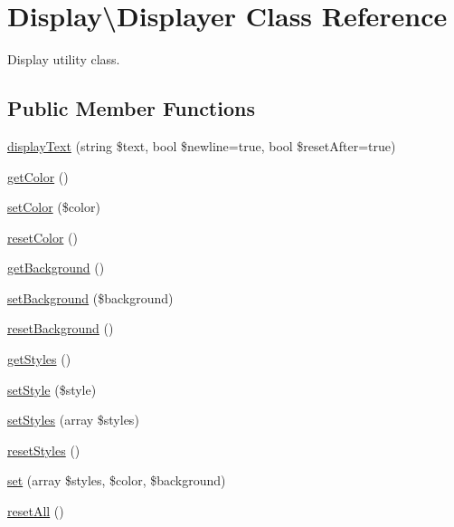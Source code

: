 \hypertarget{classDisplay_1_1Displayer}{}\section{Display\textbackslash{}Displayer Class Reference}
\label{classDisplay_1_1Displayer}


Display utility class.  


\subsection*{Public Member Functions}
\begin{DoxyCompactItemize}
\item 
\hyperlink{classDisplay_1_1Displayer_a2e7ce80672e8e2433dce68eb7850090d}{display\+Text} (string \$text, bool \$newline=true, bool \$reset\+After=true)
\item 
\hyperlink{classDisplay_1_1Displayer_ac1a45d0e8bfd18db8a841172df12b44d}{get\+Color} ()
\item 
\hyperlink{classDisplay_1_1Displayer_a2df23fef055ca84673a9a90f55f3e3ee}{set\+Color} (\$color)
\item 
\hyperlink{classDisplay_1_1Displayer_af1da840727c16ebc4f08bbec07e5f86a}{reset\+Color} ()
\item 
\hyperlink{classDisplay_1_1Displayer_a3db965b4e13997094ba8527bfee8e60f}{get\+Background} ()
\item 
\hyperlink{classDisplay_1_1Displayer_ada8b108ad4678f8f94337748db34a062}{set\+Background} (\$background)
\item 
\hyperlink{classDisplay_1_1Displayer_afd285ad90f1eb4341a370f17ff7ab725}{reset\+Background} ()
\item 
\hyperlink{classDisplay_1_1Displayer_af1a84beba7ba2afd60dbe13814db5f42}{get\+Styles} ()
\item 
\hyperlink{classDisplay_1_1Displayer_ab9ba6574d40f5ecd249e461ac7e376b5}{set\+Style} (\$style)
\item 
\hyperlink{classDisplay_1_1Displayer_a2f6f5f0314cdb53ea96baa7dda489154}{set\+Styles} (array \$styles)
\item 
\hyperlink{classDisplay_1_1Displayer_ad30a8f26128fb57aa7b862a7eb899c0b}{reset\+Styles} ()
\item 
\hyperlink{classDisplay_1_1Displayer_a99a0bbaef46d045ad055692abaf153c3}{set} (array \$styles, \$color, \$background)
\item 
\hyperlink{classDisplay_1_1Displayer_a42bb7920ed6bc44c6e08747b87b1de63}{reset\+All} ()
\end{DoxyCompactItemize}
